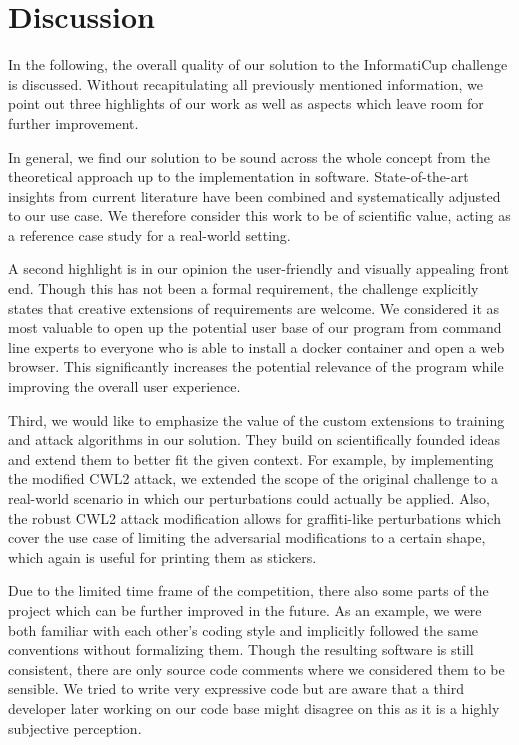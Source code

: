 
\section{Discussion}\label{sec:discussion}
In the following, the overall quality of our solution to the InformatiCup challenge is discussed.
Without recapitulating all previously mentioned information, we point out three highlights of our work as well as aspects which leave room for further improvement.

In general, we find our solution to be sound across the whole concept from the theoretical approach up to the implementation in software.
State-of-the-art insights from current literature have been combined and systematically adjusted to our use case.
We therefore consider this work to be of scientific value, acting as a reference case study for a real-world setting.

A second highlight is in our opinion the user-friendly and visually appealing front end.
Though this has not been a formal requirement, the challenge explicitly states that creative extensions of requirements are welcome.
We considered it as most valuable to open up the potential user base of our program from command line experts to everyone who is able to install a docker container and open a web browser.
This significantly increases the potential relevance of the program while improving the overall user experience.

Third, we would like to emphasize the value of the custom extensions to training and attack algorithms in our solution.
They build on scientifically founded ideas and extend them to better fit the given context.
For example, by implementing the modified CWL2 attack, we extended the scope of the original challenge to a real-world scenario in which our perturbations could actually be applied.
Also, the robust CWL2 attack modification allows for graffiti-like perturbations which cover the use case of limiting the adversarial modifications to a certain shape, which again is useful for printing them as stickers.

Due to the limited time frame of the competition, there also some parts of the project which can be further improved in the future.
As an example, we were both familiar with each other's coding style and implicitly followed the same conventions without formalizing them.
Though the resulting software is still consistent, there are only source code comments where we considered them to be sensible.
We tried to write very expressive code but are aware that a third developer later working on our code base might disagree on this as it is a highly subjective perception.

